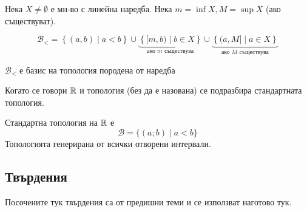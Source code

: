 \begin{definition}
    Нека $X \neq \emptyset$ е мн-во с линейна наредба. Нека $m=\inf X, M=\sup X$ (ако съществуват). 

    \begin{equation*}
        \mathcal B_< = \left\{(a,b) \mid a < b\right\} \cup \underbrace{\left\{ [m, b) \mid b \in X \right\}}_{\text{ако $m$ съществува}} \cup \underbrace{\left\{ (a, M] \mid a \in X \right\}}_{\text{ако $M$ съществува}}
    \end{equation*}
\end{definition}
\begin{notation}
    $\mathcal B_<$ е базис на топология породена от наредба
\end{notation}

Когато се говори ${\mathbb{R}}$ и топология (без да е назована) се подразбира стандартната топология.
\begin{definition}
    Стандартна топология на ${\mathbb{R}}$ е
    \begin{equation*}
        \mathcal B = \{(a;b) \mid a<b\}
    \end{equation*}
    Топологията генерирана от всички отворени интервали.
\end{definition}

\subsection{Твърдения}
Посочените тук твърдения са от предишни теми и се използват наготово тук.

